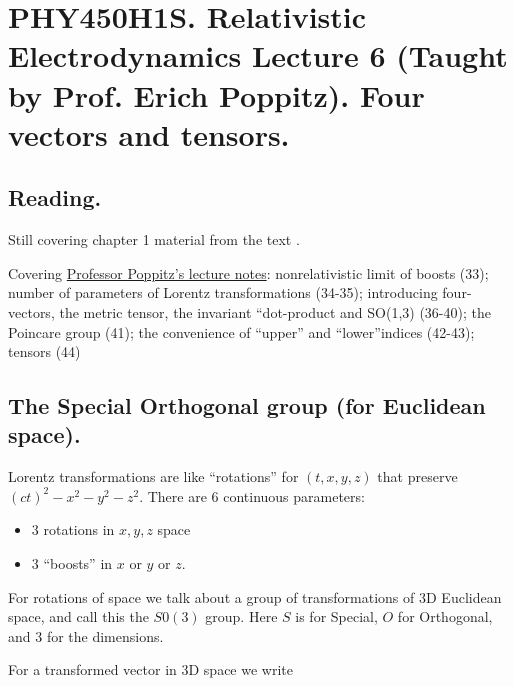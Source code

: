 
%

\chapter{PHY450H1S.  Relativistic Electrodynamics Lecture 6 (Taught by Prof. Erich Poppitz).  Four vectors and tensors.}
\label{chap:relativisticElectrodynamicsL6}
{}
\date{Jan 25, 2011}

\beginArtNoToc

\section{Reading.}

Still covering chapter 1 material from the text \cite{landau1980classical}.

Covering \href{http://www.physics.utoronto.ca/~poppitz/e-poppitz/PHY450_files/RelEM27-44.pdf}{Professor Poppitz's lecture notes}: nonrelativistic limit of boosts (33); number of parameters of Lorentz transformations (34-35); introducing four-vectors, the metric tensor, the invariant ``dot-product and SO(1,3) (36-40); the Poincare group (41); the convenience of ``upper'' and ``lower''indices (42-43); tensors (44) 

\section{The Special Orthogonal group (for Euclidean space).}

Lorentz transformations are like ``rotations'' for $(t, x, y, z)$ that preserve $(ct)^2 - x^2 - y^2 - z^2$.  There are 6 continuous parameters:

\begin{itemize}
\item 3 rotations in $x,y,z$ space
\item 3 ``boosts'' in $x$ or $y$ or $z$.
\end{itemize}

For rotations of space we talk about a group of transformations of 3D Euclidean space, and call this the $S0(3)$ group.  Here $S$ is for Special, $O$ for Orthogonal, and $3$ for the dimensions.

For a transformed vector in 3D space we write

